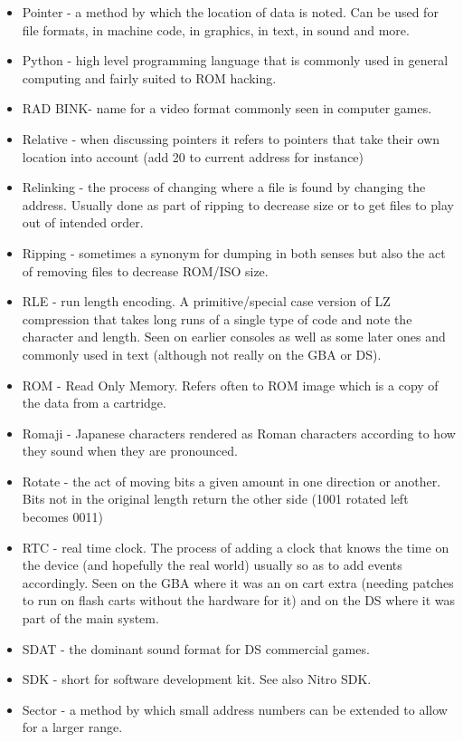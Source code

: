 \documentclass[
]{book}
\begin{document}
\begin{itemize}
\item
  Pointer - a method by which the location of data is noted. Can be used for file formats, in machine code, in graphics, in text, in sound and more.
\item
  Python - high level programming language that is commonly used in general computing and fairly suited to ROM hacking.
\item
  RAD BINK- name for a video format commonly seen in computer games.
\item
  Relative - when discussing pointers it refers to pointers that take their own location into account (add 20 to current address for instance)
\item
  Relinking - the process of changing where a file is found by changing the address. Usually done as part of ripping to decrease size or to get files to play out of intended order.
\item
  Ripping - sometimes a synonym for dumping in both senses but also the act of removing files to decrease ROM/ISO size.
\item
  RLE - run length encoding. A primitive/special case version of LZ compression that takes long runs of a single type of code and note the character and length. Seen on earlier consoles as well as some later ones and commonly used in text (although not really on the GBA or DS).
\item
  ROM - Read Only Memory. Refers often to ROM image which is a copy of the data from a cartridge.
\item
  Romaji - Japanese characters rendered as Roman characters according to how they sound when they are pronounced.
\item
  Rotate - the act of moving bits a given amount in one direction or another. Bits not in the original length return the other side (1001 rotated left becomes 0011)
\item
  RTC - real time clock. The process of adding a clock that knows the time on the device (and hopefully the real world) usually so as to add events accordingly. Seen on the GBA where it was an on cart extra (needing patches to run on flash carts without the hardware for it) and on the DS where it was part of the main system.
\item
  SDAT - the dominant sound format for DS commercial games.
\item
  SDK - short for software development kit. See also Nitro SDK.
\item
  Sector - a method by which small address numbers can be extended to allow for a larger range.

\end{itemize}
\end{document}
